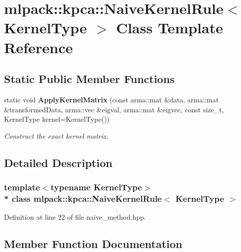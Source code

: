 \section{mlpack\+:\+:kpca\+:\+:Naive\+Kernel\+Rule$<$ Kernel\+Type $>$ Class Template Reference}
\label{classmlpack_1_1kpca_1_1NaiveKernelRule}
\subsection*{Static Public Member Functions}
\begin{DoxyCompactItemize}
\item 
static void {\bf Apply\+Kernel\+Matrix} (const arma\+::mat \&data, arma\+::mat \&transformed\+Data, arma\+::vec \&eigval, arma\+::mat \&eigvec, const size\+\_\+t, Kernel\+Type kernel=Kernel\+Type())
\begin{DoxyCompactList}\small\item\em Construct the exact kernel matrix. \end{DoxyCompactList}\end{DoxyCompactItemize}


\subsection{Detailed Description}
\subsubsection*{template$<$typename Kernel\+Type$>$\\*
class mlpack\+::kpca\+::\+Naive\+Kernel\+Rule$<$ Kernel\+Type $>$}



Definition at line 22 of file naive\+\_\+method.\+hpp.



\subsection{Member Function Documentation}
